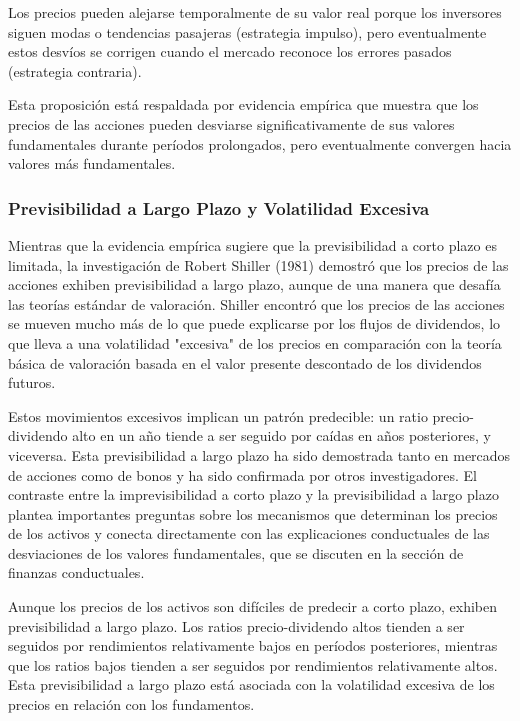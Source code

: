 \begin{proposicion}
Los precios pueden alejarse temporalmente de su valor real porque los inversores siguen modas o tendencias pasajeras (estrategia impulso), pero eventualmente estos desvíos se corrigen cuando el mercado reconoce los errores pasados (estrategia contraria).
\end{proposicion}

Esta proposición está respaldada por evidencia empírica que muestra que los precios de las acciones pueden desviarse significativamente de sus valores fundamentales durante períodos prolongados, pero eventualmente convergen hacia valores más fundamentales.

\subsubsection{Previsibilidad a Largo Plazo y Volatilidad Excesiva}

Mientras que la evidencia empírica sugiere que la previsibilidad a corto plazo es limitada, la investigación de Robert Shiller (1981) demostró que los precios de las acciones exhiben previsibilidad a largo plazo, aunque de una manera que desafía las teorías estándar de valoración. Shiller encontró que los precios de las acciones se mueven mucho más de lo que puede explicarse por los flujos de dividendos, lo que lleva a una volatilidad "excesiva" de los precios en comparación con la teoría básica de valoración basada en el valor presente descontado de los dividendos futuros.

Estos movimientos excesivos implican un patrón predecible: un ratio precio-dividendo alto en un año tiende a ser seguido por caídas en años posteriores, y viceversa. Esta previsibilidad a largo plazo ha sido demostrada tanto en mercados de acciones como de bonos y ha sido confirmada por otros investigadores. El contraste entre la imprevisibilidad a corto plazo y la previsibilidad a largo plazo plantea importantes preguntas sobre los mecanismos que determinan los precios de los activos y conecta directamente con las explicaciones conductuales de las desviaciones de los valores fundamentales, que se discuten en la sección de finanzas conductuales.

\begin{proposicion}
Aunque los precios de los activos son difíciles de predecir a corto plazo, exhiben previsibilidad a largo plazo. Los ratios precio-dividendo altos tienden a ser seguidos por rendimientos relativamente bajos en períodos posteriores, mientras que los ratios bajos tienden a ser seguidos por rendimientos relativamente altos. Esta previsibilidad a largo plazo está asociada con la volatilidad excesiva de los precios en relación con los fundamentos.
\end{proposicion}

